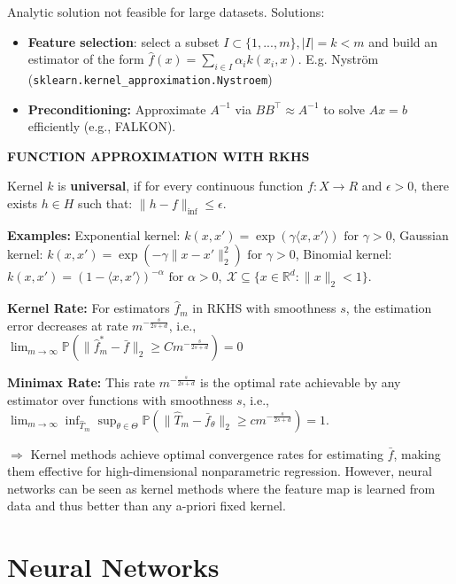 \documentclass[a4paper,10pt]{article}
\newenvironment{myitemize}
{\vspace{-0.25cm}\begin{itemize}}
{\end{itemize}}
\newcommand{\subtitle}[1]{\vspace{0.25cm}\begin{normalsize}\textbf{\textcolor{gray!150}{\uppercase{#1}}}\end{normalsize}}
\begin{document}
\begin{small}
\vspace{0.1cm}
Analytic solution not feasible for large datasets. Solutions:

\begin{myitemize}
    \item \textbf{Feature selection}: select a subset $I \subset \{1,..., m\}, |I|= k < m$ and build an estimator of the form $\hat{f}(x) = \sum_{i \in I} \alpha_i k(x_i, x)$. E.g. Nyström (\texttt{sklearn.kernel\_approximation.Nystroem})
    \item\textbf{Preconditioning:} Approximate $A^{-1}$ via $BB^\top \approx A^{-1}$ to solve $Ax = b$ efficiently (e.g., FALKON).
\end{myitemize}

\subtitle{Function approximation with RKHS}

Kernel $k$ is \textbf{universal}, if for every continuous function $f : X \to R$ and $\epsilon > 0$, there exists $h \in H$ such that: $\|h -f \|_{\inf} \leq \epsilon$. 

\textbf{Examples:}  Exponential kernel: $k(x, x') = \exp(\gamma \langle x, x' \rangle) \text{ for } \gamma > 0$, 
Gaussian kernel: $k(x, x') = \exp\left(-\gamma \|x - x'\|_2^2\right) \text{ for } \gamma > 0$, 
Binomial kernel: $k(x, x') = (1 - \langle x, x' \rangle)^{-\alpha} \text{ for } \alpha > 0, \ \mathcal{X} \subseteq \{x \in \mathbb{R}^d : \|x\|_2 < 1\}$.


\textbf{Kernel Rate:} For estimators $ \hat{f}_m $ in RKHS with smoothness $ s $, the estimation error decreases at rate $ m^{-\frac{s}{2s + d}} $, i.e., \\
$
\lim_{m \to \infty} \mathbb{P} \left( \| \hat{f}_m^* - \bar{f} \|_2 \geq C m^{-\frac{s}{2s + d}} \right) = 0
$

\textbf{Minimax Rate:} This rate $ m^{-\frac{s}{2s + d}} $ is the optimal rate achievable by any estimator over functions with smoothness $ s $, i.e., 
$
\lim_{m \to \infty} \inf_{\hat{T}_m} \sup_{\theta \in \Theta} \mathbb{P} \left( \| \hat{T}_m - \bar{f}_\theta \|_2 \geq c m^{-\frac{s}{2s + d}} \right) = 1.
$

$\Rightarrow$ Kernel methods achieve optimal convergence rates for estimating $ \bar{f} $, making them effective for high-dimensional nonparametric regression. However, neural networks can be seen as kernel methods where the feature map is learned from data and thus better than any a-priori fixed kernel.

\clearpage

\section{Neural Networks}


\end{small}
\end{document}
